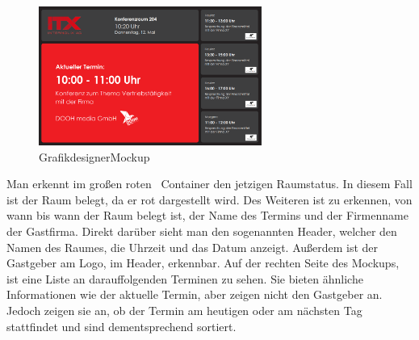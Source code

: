 \newline
\begin{figure}[hbt!]
\par\vspace{1cm}
\centering
\includegraphics[width=0.65\textwidth]{Bilder/GrafikdesignerMockup}
\caption{GrafikdesignerMockup}
\label{fig:GrafikdesignerMockup}
\par\vspace{1cm}
\end{figure}
\justifying
{}
Man erkennt im großen roten ~\gls{Container} den jetzigen Raumstatus.
In diesem Fall ist der Raum belegt, da er rot dargestellt wird.
Des Weiteren ist zu erkennen, von wann bis wann der Raum belegt ist, der Name des Termins und der Firmenname der Gastfirma.
\newline
{}
Direkt darüber sieht man den sogenannten \gls{Header}, welcher den Namen des Raumes, die Uhrzeit und das Datum anzeigt.
Außerdem ist der Gastgeber am Logo, im Header, erkennbar.
\newline
Auf der rechten Seite des Mockups, ist eine Liste an darauffolgenden Terminen zu sehen.
Sie bieten ähnliche Informationen wie der aktuelle Termin, aber zeigen nicht den Gastgeber an.
Jedoch zeigen sie an, ob der Termin am heutigen oder am nächsten Tag stattfindet und sind dementsprechend sortiert.
\newline
\newline

